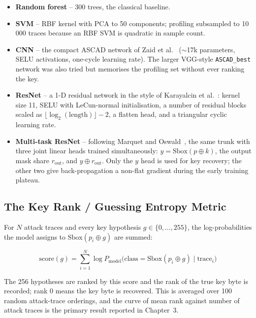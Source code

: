\begin{itemize}
\item \textbf{Random forest} -- 300 trees, the classical baseline.
\item \textbf{SVM} -- RBF kernel with PCA to 50 components; profiling subsampled to
      10\,000 traces because an RBF SVM is quadratic in sample count.
\item \textbf{CNN} -- the compact ASCAD network of Zaid et al.~\cite{zaid2020} ($\sim$17k
      parameters, SELU activations, one-cycle learning rate). The larger VGG-style
      \texttt{ASCAD\_best} network was also tried but memorises the profiling set
      without ever ranking the key.
\item \textbf{ResNet} -- a 1-D residual network in the style of Karayalcin et
      al.~\cite{karayalcin2023}: kernel size 11, SELU with LeCun-normal
      initialisation, a number of residual blocks scaled as
      $\lfloor\log_2(\text{length})\rfloor-2$, a flatten head, and a triangular
      cyclic learning rate.
\item \textbf{Multi-task ResNet} -- following Marquet and
      Oswald~\cite{marquet2023}, the same trunk with three joint linear heads
      trained simultaneously: $y=\mathrm{Sbox}(p\oplus k)$, the output mask share
      $r_{\text{out}}$, and $y\oplus r_{\text{out}}$. Only the $y$ head is used for
      key recovery; the other two give back-propagation a non-flat gradient during
      the early training plateau.
\end{itemize}

\subsection{The Key Rank / Guessing Entropy Metric}

For $N$ attack traces and every key hypothesis $g\in\{0,\dots,255\}$, the
log-probabilities the model assigns to $\mathrm{Sbox}(p_i\oplus g)$ are summed:

\begin{equation}
\mathrm{score}(g) = \sum_{i=1}^{N} \log P_{\text{model}}\bigl(\text{class} =
\mathrm{Sbox}(p_i \oplus g) \;\big|\; \text{trace}_i\bigr)
\label{eq:keyrank}
\end{equation}

The 256 hypotheses are ranked by this score and the rank of the true key byte is
recorded; rank 0 means the key byte is recovered. This is averaged over 100 random
attack-trace orderings, and the curve of mean rank against number of attack traces is
the primary result reported in Chapter~3.

